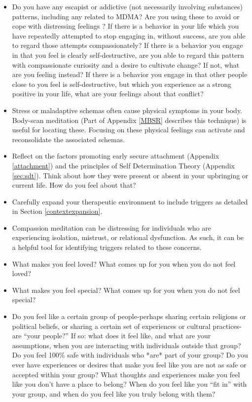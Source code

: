 \documentclass[12pt,letterpaper]{article}
\begin{document}
\begin{itemize}
    \item Do you have any escapist or addictive (not necessarily involving substances) patterns, including any related to MDMA? Are you using these to avoid or cope with distressing feelings \cite{forsterTraumaAddiction,alaviBehavioralAddiction}? If there is a behavior in your life which you have repeatedly attempted to stop engaging in, without success, are you able to regard those attempts compassionately? If there is a behavior you engage in that you feel is clearly self-destructive, are you able to regard this pattern with compassionate curiosity and a desire to cultivate change? If not, what are you feeling instead? If there is a behavior you engage in that other people close to you feel is self-destructive, but which you experience as a strong positive in your life, what are your feelings about that conflict?
    \item Stress or maladaptive schemas often cause physical symptoms in your body. Body-scan meditation (Part of Appendix \ref{MBSR} describes this technique) is useful for locating these. Focusing on these physical feelings can activate and reconsolidate the associated schemas.
    \item Reflect on the factors promoting early secure attachment (Appendix \ref{attachment}) and the principles of Self Determination Theory (Appendix \ref{sec:sdt}). Think about how they were present or absent in your upbringing or current life. How do you feel about that? 
    \item Carefully expand your therapeutic environment to include triggers as detailed in Section \ref{contextexpansion}.
    \item Compassion meditation can be distressing for individuals who are experiencing isolation, mistrust, or relational dysfunction. As such, it can be a helpful tool for identifying triggers related to these concerns. 
    \item What makes you feel loved? What comes up for you when you do not feel loved?
    \item What makes you feel special? What comes up for you when you do not feel special?
    \item Do you feel like a certain group of people-perhaps sharing certain religions or political beliefs, or sharing a certain set of experiences or cultural practices-are “your people?”  If so: what does it feel like, and what are your assumptions, when you are interacting with individuals outside that group? Do you feel 100\% safe with individuals who *are* part of your group? Do you ever have experiences or desires that make you feel like you are not as safe or accepted within your group? What thoughts and experiences make you feel like you don’t have a place to belong? When do you feel like you “fit in” with your group, and when do you feel like you truly belong with them?

\end{itemize}
\end{document}
